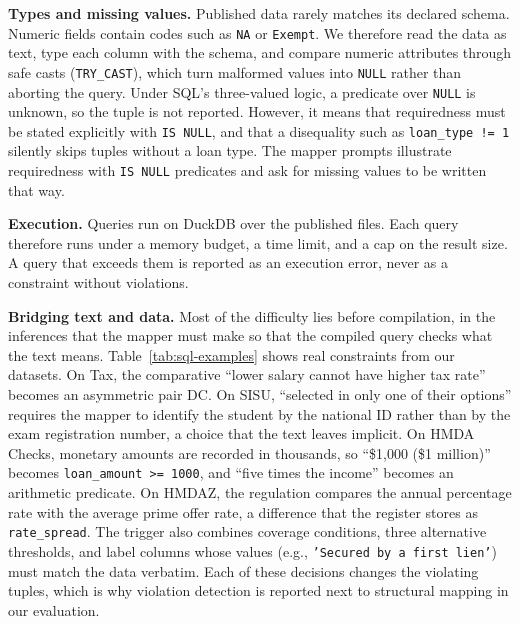 \smallskip\noindent\textbf{Types and missing values.}
Published data rarely matches its declared schema. Numeric fields contain codes such as \texttt{NA} or \texttt{Exempt}. We therefore read the data as text, type each column with the schema, and compare numeric attributes through safe casts (\texttt{TRY\_CAST}), which turn malformed values into \texttt{NULL} rather than aborting the query. Under SQL's three-valued logic, a predicate over \texttt{NULL} is unknown, so the tuple is not reported. However, it means that requiredness must be stated explicitly with \texttt{IS NULL}, and that a disequality such as \texttt{loan\_type != 1} silently skips tuples without a loan type. The mapper prompts illustrate requiredness with \texttt{IS NULL} predicates and ask for missing values to be written that way.

\smallskip\noindent\textbf{Execution.}
Queries run on DuckDB over the published files. Each query therefore runs under a memory budget, a time limit, and a cap on the result size. A query that exceeds them is reported as an execution error, never as a constraint without violations.

\smallskip\noindent\textbf{Bridging text and data.}
Most of the difficulty lies before compilation, in the inferences that the mapper must make so that the compiled query checks what the text means. Table~\ref{tab:sql-examples} shows real constraints from our datasets. On Tax, the comparative ``lower salary cannot have higher tax rate'' becomes an asymmetric pair DC. On SISU, ``selected in only one of their options'' requires the mapper to identify the student by the national ID rather than by the exam registration number, a choice that the text leaves implicit. On HMDA Checks, monetary amounts are recorded in thousands, so ``\$1,000 (\$1 million)'' becomes \texttt{loan\_amount >= 1000}, and ``five times the income'' becomes an arithmetic predicate. On HMDAZ, the regulation compares the annual percentage rate with the average prime offer rate, a difference that the register stores as \texttt{rate\_spread}. The trigger also combines coverage conditions, three alternative thresholds, and label columns whose values (e.g., \texttt{'Secured by a first lien'}) must match the data verbatim. Each of these decisions changes the violating tuples, which is why violation detection is reported next to structural mapping in our evaluation.

